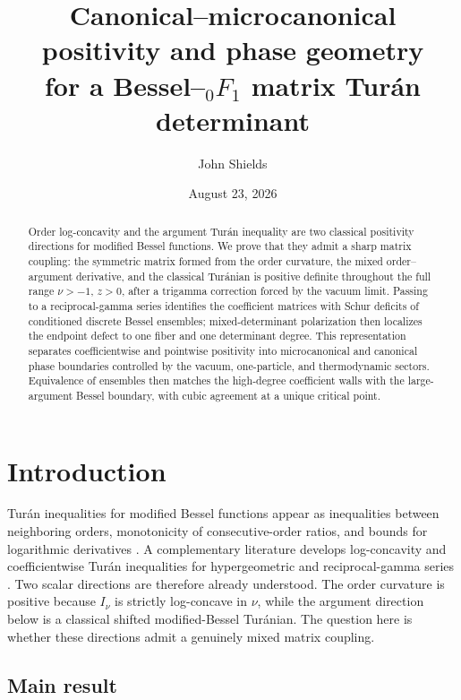 \documentclass[11pt,a4paper]{amsart}
\title[Canonical--microcanonical positivity for a Bessel Tur\'an determinant]
{Canonical--microcanonical positivity and phase geometry\\
for a Bessel--\({}_0F_1\) matrix Tur\'an determinant}
\author{John Shields}
\date{August 23, 2026}
\numberwithin{equation}{section}
\theoremstyle{plain}
\theoremstyle{definition}
\begin{document}
\begin{abstract}
Order log-concavity and the argument Tur\'an inequality are two classical
positivity directions for modified Bessel functions.  We prove that they admit
a sharp matrix coupling: the symmetric matrix formed from the order curvature,
the mixed order--argument derivative, and the classical Tur\'anian is positive
definite throughout the full range \(\nu>-1\), \(z>0\), after a trigamma
correction forced by the vacuum limit.  Passing to a reciprocal-gamma series
identifies the coefficient matrices with Schur deficits of conditioned discrete
Bessel ensembles; mixed-determinant polarization then localizes the endpoint
defect to one fiber and one determinant degree.
This representation separates coefficientwise and pointwise positivity into
microcanonical and canonical phase boundaries controlled by the vacuum,
one-particle, and thermodynamic sectors.  Equivalence of ensembles then matches
the high-degree coefficient walls with the large-argument Bessel boundary,
with cubic agreement at a unique critical point.
\end{abstract}

\maketitle

\section{Introduction}\label{sec:introduction}

Tur\'an inequalities for modified Bessel functions appear as inequalities
between neighboring orders, monotonicity of consecutive-order ratios, and
bounds for logarithmic derivatives
\cite{Baricz2010TuranBessel,BariczPonnusamy2013TuranBessel,Watson1944TreatiseBessel}.
A complementary literature develops log-concavity and coefficientwise Tur\'an
inequalities for hypergeometric and reciprocal-gamma series
\cite{KalmykovKarp2013Reciprocal,KalmykovKarp2013Ratios,KalmykovKarp2014LogConcavity,KarpSitnik2010LogConvexity,KarpZhang2024LogConcavity}.
Two scalar directions are therefore already understood.  The order curvature
is positive because \(I_\nu\) is strictly log-concave in \(\nu\), while the
argument direction below is a classical shifted modified-Bessel Tur\'anian.
The question here is whether these directions admit a genuinely mixed matrix
coupling.

\subsection{Main result}\label{subsec:intro-main}
\end{document}
